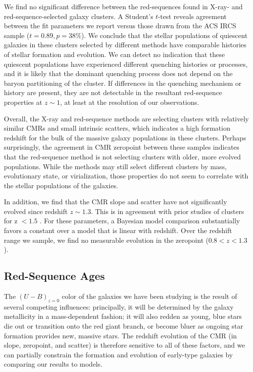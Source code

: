 We find no significant difference between the red-sequences found in X-ray- and red-sequence-selected galaxy clusters. A Student's $t$-test reveals agreement between the fit parameters we report versus those drawn from the ACS IRCS sample ($t=0.89, p=38\%$). We conclude that the stellar populations of quiescent galaxies in these clusters selected by different methods have comparable histories of stellar formation and evolution.
We can detect no indication that these quiescent populations have experienced different quenching histories or processes, and it is likely that the dominant quenching process does not depend on the baryon partitioning of the cluster.
If differences in the quenching mechanism or history are present, they are not detectable in the resultant red-sequence properties at $z \sim 1$, at least at the resolution of our observations.

Overall, the X-ray and red-sequence methods are selecting clusters with relatively similar CMRs and small intrinsic scatters, which indicates a high formation redshift for the bulk of the massive galaxy populations in these clusters.
Perhaps surprisingly, the agreement in CMR zeropoint between these samples indicates that the red-sequence method is not selecting clusters with older, more evolved populations.
While the methods may still select different clusters by mass, evolutionary state, or virialization, those properties do not seem to correlate with the stellar populations of the galaxies.

In addition, we find that the CMR slope and scatter have not significantly evolved since redshift $z\sim1.3$. This is in agreement with prior studies of clusters for z $< 1.5$ \citep[e.g. M09, ][]{Snyder:2012wq}.
For these parameters, a Bayesian model comparison substantially favors a constant over a model that is linear with redshift. Over the redshift range we sample, we find no measurable evolution in the zeropoint ($0.8 < z < 1.3$).

\subsection{Red-Sequence Ages}\label{sec-CMR-age}

The $(U-B)_{z=0}$ color of the galaxies we have been studying is the result of several competing influences: principally, it will be determined by the galaxy metallicity in a mass-dependent fashion; it will also redden as young, blue stars die out or transition onto the red giant branch, or become bluer as ongoing star formation provides new, massive stars. The redshift evolution of the CMR (in slope, zeropoint, and scatter) is therefore sensitive to all of these factors, and we can partially constrain the formation and evolution of early-type galaxies by comparing our results to models.

